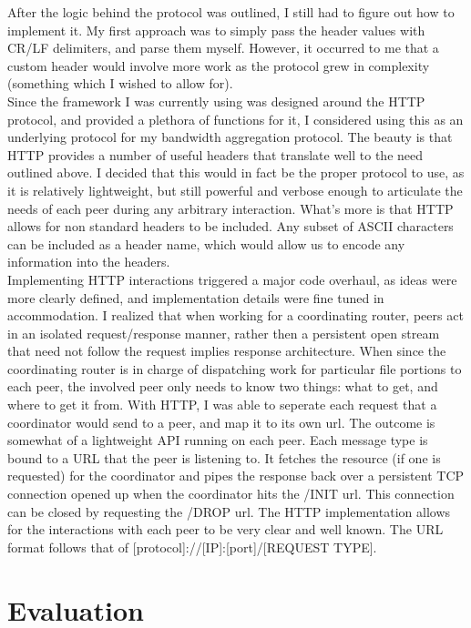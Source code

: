 \documentclass[12pt]{article}
\begin{document}
		After the logic behind the protocol was outlined, I still had to figure out how to implement it. My first  approach was to simply pass the header values with CR/LF delimiters, and parse them myself. However, it occurred to me that a custom header would involve more work as the protocol grew in complexity (something which I wished to allow for).\\

		Since the framework I was currently using was designed around the HTTP protocol, and provided a plethora of functions for it, I considered using this as an underlying protocol for my bandwidth aggregation protocol. The beauty is that HTTP provides a number of useful headers that translate well to the need outlined above. I decided that this would in fact be the proper protocol to use, as it is relatively lightweight, but still powerful and verbose enough to articulate the needs of each peer during any arbitrary interaction. What's more is that HTTP allows for non standard headers to be included. Any subset of ASCII characters can be included as a header name, which would allow us to encode any information into the headers.\\

		Implementing HTTP interactions triggered a major code overhaul, as ideas were more clearly defined, and implementation details were fine tuned in accommodation. I realized that when working for a coordinating router, peers act in an isolated request/response manner, rather then a persistent open stream that need not follow the request implies response architecture. When since the coordinating router is in charge of dispatching work for particular file portions to each peer, the involved peer only needs to know two things: what to get, and where to get it from. With HTTP, I was able to seperate each request that a coordinator would send to a peer, and map it to its own url. The outcome is somewhat of a lightweight API running on each peer. Each message type is bound to a URL that the peer is listening to. It fetches the resource (if one is requested) for the coordinator and pipes the response back over a persistent TCP connection opened up when the coordinator hits the /INIT url. This connection can be closed by requesting the /DROP url. The HTTP implementation allows for the interactions with each peer to be very clear and well known. The URL format follows that of [protocol]://[IP]:[port]/[REQUEST TYPE].\\

		
\section{Evaluation}
\end{document}

